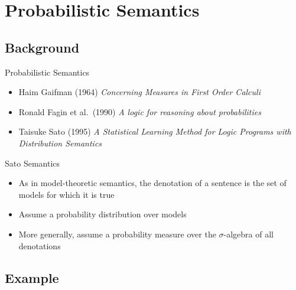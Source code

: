 \documentclass{beamer}
\newlength{\wideitemsep}
\let\olditem\item
\renewcommand{\item}{\setlength{\itemsep}{\wideitemsep}\olditem}
\begin{document}
\section{Probabilistic Semantics}

\subsection{Background}

\begin{frame}{Probabilistic Semantics}
\begin{itemize}
\item Haim Gaifman (1964) \textit{Concerning Measures in First Order Calculi}
\item Ronald Fagin et al.~(1990) \textit{A logic for reasoning about probabilities}
\item Taisuke Sato (1995) \textit{A Statistical Learning Method for Logic Programs with Distribution Semantics}
\end{itemize}
\end{frame}

\begin{frame}{Sato Semantics}
\begin{itemize}
\item As in model-theoretic semantics, the denotation of a sentence is
  the set of models for which it is true
\item Assume a probability distribution over models
\item More generally, assume a probability measure over the $\sigma$-algebra of all denotations
\end{itemize}
\end{frame}

\subsection{Example}
\end{document}
